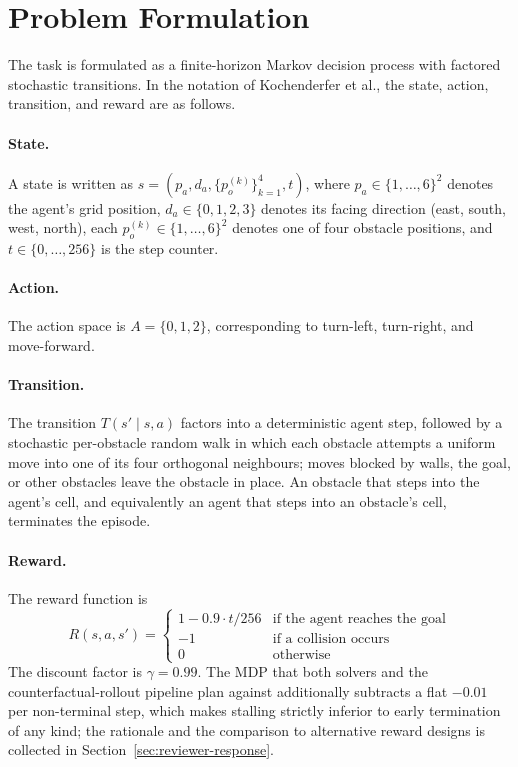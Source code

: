 \documentclass[conference]{IEEEtran}
\begin{document}
\section{Problem Formulation}
\label{sec:problem}
The task is formulated as a finite-horizon Markov decision process
with factored stochastic transitions. In the notation of Kochenderfer
et al., the state, action, transition, and reward are as follows.

\paragraph{State.} A state is written as
$s = (p_a, d_a, \{p^{(k)}_o\}_{k=1}^{4}, t)$, where
$p_a \in \{1,\dots,6\}^2$ denotes the agent's grid position,
$d_a \in \{0, 1, 2, 3\}$ denotes its facing direction (east, south,
west, north), each $p^{(k)}_o \in \{1,\dots,6\}^2$ denotes one of four
obstacle positions, and $t \in \{0, \dots, 256\}$ is the step counter.

\paragraph{Action.} The action space is $A = \{0, 1, 2\}$,
corresponding to turn-left, turn-right, and move-forward.

\paragraph{Transition.} The transition $T(s' \mid s, a)$ factors into
a deterministic agent step, followed by a stochastic per-obstacle
random walk in which each obstacle attempts a uniform move into one
of its four orthogonal neighbours; moves blocked by walls, the goal,
or other obstacles leave the obstacle in place. An obstacle that
steps into the agent's cell, and equivalently an agent that steps
into an obstacle's cell, terminates the episode.

\paragraph{Reward.} The reward function is
\begin{equation}
R(s, a, s') =
\begin{cases}
1 - 0.9 \cdot t/256 & \text{if the agent reaches the goal} \\
-1 & \text{if a collision occurs} \\
0 & \text{otherwise}
\end{cases}
\end{equation}
The discount factor is $\gamma = 0.99$. The MDP that both solvers and
the counterfactual-rollout pipeline plan against additionally
subtracts a flat $-0.01$ per non-terminal step, which makes stalling
strictly inferior to early termination of any kind; the rationale and
the comparison to alternative reward designs is collected in
Section~\ref{sec:reviewer-response}.
\end{document}
